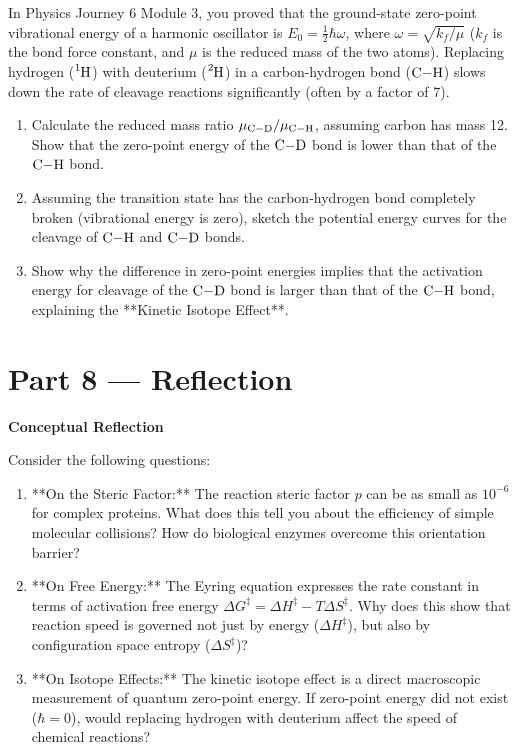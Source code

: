 \documentclass[12pt, a4paper]{book}
\begin{document}
\begin{deepbox}
\begin{enumerate}[label=\textbf{D\arabic*.}]
        In Physics Journey 6 Module 3, you proved that the ground-state zero-point vibrational energy of a harmonic oscillator is $E_0 = \frac{1}{2}\hbar\omega$, where $\omega = \sqrt{k_f/\mu}$ ($k_f$ is the bond force constant, and $\mu$ is the reduced mass of the two atoms).
        Replacing hydrogen ($\ce{^1H}$) with deuterium ($\ce{^2H}$) in a carbon-hydrogen bond ($\ce{C-H}$) slows down the rate of cleavage reactions significantly (often by a factor of 7).
        \begin{enumerate}[label=(\alph*)]
          \item Calculate the reduced mass ratio $\mu_{\ce{C-D}}/\mu_{\ce{C-H}}$, assuming carbon has mass 12. Show that the zero-point energy of the $\ce{C-D}$ bond is lower than that of the $\ce{C-H}$ bond.
          \item Assuming the transition state has the carbon-hydrogen bond completely broken (vibrational energy is zero), sketch the potential energy curves for the cleavage of $\ce{C-H}$ and $\ce{C-D}$ bonds.
          \item Show why the difference in zero-point energies implies that the activation energy for cleavage of the $\ce{C-D}$ bond is larger than that of the $\ce{C-H}$ bond, explaining the **Kinetic Isotope Effect**.
        \end{enumerate}
\end{enumerate}
\end{deepbox}

\newpage

\section{Part 8 --- Reflection}

\begin{reflectionbox}
\textbf{Conceptual Reflection}

Consider the following questions:
\begin{enumerate}
  \item **On the Steric Factor:** The reaction steric factor $p$ can be as small as $10^{-6}$ for complex proteins. What does this tell you about the efficiency of simple molecular collisions? How do biological enzymes overcome this orientation barrier?
  \item **On Free Energy:** The Eyring equation expresses the rate constant in terms of activation free energy $\Delta G^\ddagger = \Delta H^\ddagger - T\Delta S^\ddagger$. Why does this show that reaction speed is governed not just by energy ($\Delta H^\ddagger$), but also by configuration space entropy ($\Delta S^\ddagger$)?
  \item **On Isotope Effects:** The kinetic isotope effect is a direct macroscopic measurement of quantum zero-point energy. If zero-point energy did not exist ($\hbar = 0$), would replacing hydrogen with deuterium affect the speed of chemical reactions?
\end{enumerate}
\end{reflectionbox}
\end{document}
